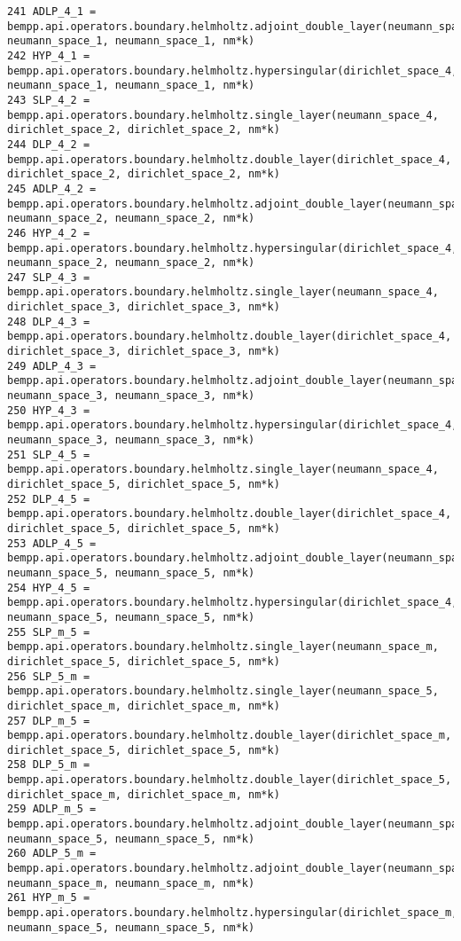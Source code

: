 \documentclass[12pt,letterpaper]{report}
\numberwithin{equation}{section}
\begin{document}
\begin{lstlisting}
241 ADLP_4_1 = bempp.api.operators.boundary.helmholtz.adjoint_double_layer(neumann_space_4, neumann_space_1, neumann_space_1, nm*k)
242 HYP_4_1 = bempp.api.operators.boundary.helmholtz.hypersingular(dirichlet_space_4, neumann_space_1, neumann_space_1, nm*k)
243 SLP_4_2 = bempp.api.operators.boundary.helmholtz.single_layer(neumann_space_4, dirichlet_space_2, dirichlet_space_2, nm*k)
244 DLP_4_2 = bempp.api.operators.boundary.helmholtz.double_layer(dirichlet_space_4, dirichlet_space_2, dirichlet_space_2, nm*k)
245 ADLP_4_2 = bempp.api.operators.boundary.helmholtz.adjoint_double_layer(neumann_space_4, neumann_space_2, neumann_space_2, nm*k)
246 HYP_4_2 = bempp.api.operators.boundary.helmholtz.hypersingular(dirichlet_space_4, neumann_space_2, neumann_space_2, nm*k)
247 SLP_4_3 = bempp.api.operators.boundary.helmholtz.single_layer(neumann_space_4, dirichlet_space_3, dirichlet_space_3, nm*k)
248 DLP_4_3 = bempp.api.operators.boundary.helmholtz.double_layer(dirichlet_space_4, dirichlet_space_3, dirichlet_space_3, nm*k)
249 ADLP_4_3 = bempp.api.operators.boundary.helmholtz.adjoint_double_layer(neumann_space_4, neumann_space_3, neumann_space_3, nm*k)
250 HYP_4_3 = bempp.api.operators.boundary.helmholtz.hypersingular(dirichlet_space_4, neumann_space_3, neumann_space_3, nm*k)
251 SLP_4_5 = bempp.api.operators.boundary.helmholtz.single_layer(neumann_space_4, dirichlet_space_5, dirichlet_space_5, nm*k)
252 DLP_4_5 = bempp.api.operators.boundary.helmholtz.double_layer(dirichlet_space_4, dirichlet_space_5, dirichlet_space_5, nm*k)
253 ADLP_4_5 = bempp.api.operators.boundary.helmholtz.adjoint_double_layer(neumann_space_4, neumann_space_5, neumann_space_5, nm*k)
254 HYP_4_5 = bempp.api.operators.boundary.helmholtz.hypersingular(dirichlet_space_4, neumann_space_5, neumann_space_5, nm*k)
255 SLP_m_5 = bempp.api.operators.boundary.helmholtz.single_layer(neumann_space_m, dirichlet_space_5, dirichlet_space_5, nm*k)
256 SLP_5_m = bempp.api.operators.boundary.helmholtz.single_layer(neumann_space_5, dirichlet_space_m, dirichlet_space_m, nm*k)
257 DLP_m_5 = bempp.api.operators.boundary.helmholtz.double_layer(dirichlet_space_m, dirichlet_space_5, dirichlet_space_5, nm*k)
258 DLP_5_m = bempp.api.operators.boundary.helmholtz.double_layer(dirichlet_space_5, dirichlet_space_m, dirichlet_space_m, nm*k)
259 ADLP_m_5 = bempp.api.operators.boundary.helmholtz.adjoint_double_layer(neumann_space_m, neumann_space_5, neumann_space_5, nm*k)
260 ADLP_5_m = bempp.api.operators.boundary.helmholtz.adjoint_double_layer(neumann_space_5, neumann_space_m, neumann_space_m, nm*k)
261 HYP_m_5 = bempp.api.operators.boundary.helmholtz.hypersingular(dirichlet_space_m, neumann_space_5, neumann_space_5, nm*k)

\end{lstlisting}
\end{document}
